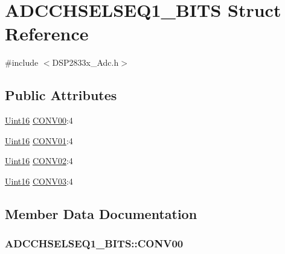 \hypertarget{struct_a_d_c_c_h_s_e_l_s_e_q1___b_i_t_s}{}\section{A\+D\+C\+C\+H\+S\+E\+L\+S\+E\+Q1\+\_\+\+B\+I\+T\+S Struct Reference}
\label{struct_a_d_c_c_h_s_e_l_s_e_q1___b_i_t_s}


{\ttfamily \#include $<$D\+S\+P2833x\+\_\+\+Adc.\+h$>$}

\subsection*{Public Attributes}
\begin{DoxyCompactItemize}
\item 
\hyperlink{_d_s_p2833x___device_8h_a59a9f6be4562c327cbfb4f7e8e18f08b}{Uint16} \hyperlink{struct_a_d_c_c_h_s_e_l_s_e_q1___b_i_t_s_a3b7f6ad5233e34916f2ce84ec53eb2f2}{C\+O\+N\+V00}\+:4
\item 
\hyperlink{_d_s_p2833x___device_8h_a59a9f6be4562c327cbfb4f7e8e18f08b}{Uint16} \hyperlink{struct_a_d_c_c_h_s_e_l_s_e_q1___b_i_t_s_a81182d5f20c62d0070bfc355f924b26c}{C\+O\+N\+V01}\+:4
\item 
\hyperlink{_d_s_p2833x___device_8h_a59a9f6be4562c327cbfb4f7e8e18f08b}{Uint16} \hyperlink{struct_a_d_c_c_h_s_e_l_s_e_q1___b_i_t_s_a52c1cf624126ad744e08aaea65f2b979}{C\+O\+N\+V02}\+:4
\item 
\hyperlink{_d_s_p2833x___device_8h_a59a9f6be4562c327cbfb4f7e8e18f08b}{Uint16} \hyperlink{struct_a_d_c_c_h_s_e_l_s_e_q1___b_i_t_s_af9b6d68ca43088439baff2b61c56182f}{C\+O\+N\+V03}\+:4
\end{DoxyCompactItemize}


\subsection{Member Data Documentation}
\hypertarget{struct_a_d_c_c_h_s_e_l_s_e_q1___b_i_t_s_a3b7f6ad5233e34916f2ce84ec53eb2f2}{}
\subsubsection[{C\+O\+N\+V00}]{ A\+D\+C\+C\+H\+S\+E\+L\+S\+E\+Q1\+\_\+\+B\+I\+T\+S\+::\+C\+O\+N\+V00}\label{struct_a_d_c_c_h_s_e_l_s_e_q1___b_i_t_s_a3b7f6ad5233e34916f2ce84ec53eb2f2}
\hypertarget{struct_a_d_c_c_h_s_e_l_s_e_q1___b_i_t_s_a81182d5f20c62d0070bfc355f924b26c}{}
